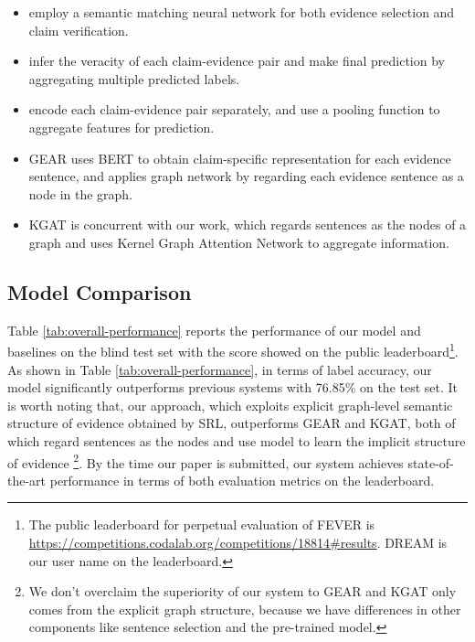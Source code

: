 \documentclass[11pt,a4paper]{article}
\begin{document}
	\begin{itemize}
		\item {} employ a semantic matching neural network for both evidence selection and claim verification. 
\item {} infer the veracity of each claim-evidence pair and make final prediction by aggregating multiple predicted labels.
		\item  {} encode each claim-evidence pair separately, and use a pooling function to aggregate features for prediction.
\item GEAR \cite{zhou-etal-2019-gear} uses BERT to obtain claim-specific representation for each evidence sentence, and applies graph network by regarding each evidence sentence as a node in the graph.
\item KGAT \cite{liu2019kernel} is concurrent with our work, which regards sentences as the nodes of a graph and uses Kernel Graph Attention Network to aggregate information. 
\end{itemize}







\subsection{Model Comparison}








Table \ref{tab:overall-performance} reports the performance of our model and baselines on the blind test set with the score showed on the public leaderboard\footnote{The public leaderboard for perpetual evaluation of FEVER is \url{https://competitions.codalab.org/competitions/18814\#results}. DREAM is our user name on the leaderboard.}.
As shown in Table \ref{tab:overall-performance}, in terms of label accuracy, our model significantly outperforms previous systems with 76.85\% on the test set.
It is worth noting that, our approach, which exploits explicit graph-level semantic structure of evidence obtained by SRL, outperforms GEAR and KGAT, both of which regard sentences as the nodes and use model to learn the implicit structure of evidence
\footnote{We don't overclaim the superiority of our system to GEAR and KGAT only comes from the explicit graph structure,  because we have differences in other components like sentence selection and the pre-trained model.}.
By the time our paper is submitted, our system achieves state-of-the-art performance in terms of both evaluation metrics on the leaderboard. 
\end{document}
